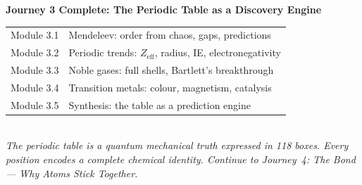 \documentclass[12pt, a4paper]{book}
\begin{document}
\vspace{1.5em}
\begin{center}
\begin{tcolorbox}[enhanced,
  colback=JourneyColor!12, colframe=JourneyColor,
  width=0.9\textwidth, arc=4pt]
\centering\sffamily
\textbf{\large Journey 3 Complete: The Periodic Table as a Discovery Engine}\\[8pt]
\small
\begin{tabular}{ll}
Module 3.1 & Mendeleev: order from chaos, gaps, predictions \\
Module 3.2 & Periodic trends: $Z_\text{eff}$, radius, IE, electronegativity \\
Module 3.3 & Noble gases: full shells, Bartlett's breakthrough \\
Module 3.4 & Transition metals: colour, magnetism, catalysis \\
Module 3.5 & Synthesis: the table as a prediction engine \\
\end{tabular}\\[8pt]
\textit{The periodic table is a quantum mechanical truth expressed
in 118 boxes.
Every position encodes a complete chemical identity.
Continue to Journey~4: The Bond --- Why Atoms Stick Together.}
\end{tcolorbox}
\end{center}
\end{document}
